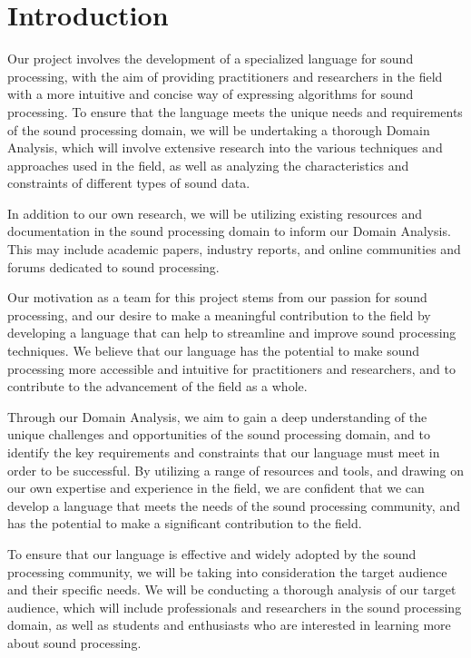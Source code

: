 \chapter*{Introduction}
Our project involves the development of a specialized language for sound processing, with the aim of providing practitioners and researchers in the field with a more intuitive and concise way of expressing algorithms for sound processing. To ensure that the language meets the unique needs and requirements of the sound processing domain, we will be undertaking a thorough Domain Analysis, which will involve extensive research into the various techniques and approaches used in the field, as well as analyzing the characteristics and constraints of different types of sound data.

In addition to our own research, we will be utilizing existing resources and documentation in the sound processing domain to inform our Domain Analysis. This may include academic papers, industry reports, and online communities and forums dedicated to sound processing.

Our motivation as a team for this project stems from our passion for sound processing, and our desire to make a meaningful contribution to the field by developing a language that can help to streamline and improve sound processing techniques. We believe that our language has the potential to make sound processing more accessible and intuitive for practitioners and researchers, and to contribute to the advancement of the field as a whole.

Through our Domain Analysis, we aim to gain a deep understanding of the unique challenges and opportunities of the sound processing domain, and to identify the key requirements and constraints that our language must meet in order to be successful. By utilizing a range of resources and tools, and drawing on our own expertise and experience in the field, we are confident that we can develop a language that meets the needs of the sound processing community, and has the potential to make a significant contribution to the field.

To ensure that our language is effective and widely adopted by the sound processing community, we will be taking into consideration the target audience and their specific needs. We will be conducting a thorough analysis of our target audience, which will include professionals and researchers in the sound processing domain, as well as students and enthusiasts who are interested in learning more about sound processing.

